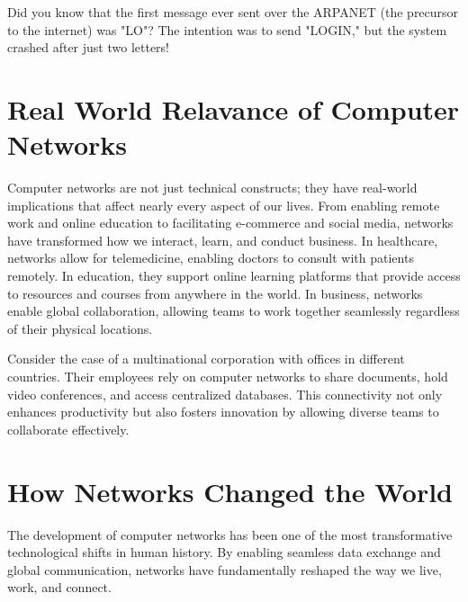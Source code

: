 \begin{didyouknowbox}
    Did you know that the first message ever sent over the ARPANET (the precursor to the internet) was "LO"? The intention was to send "LOGIN," but the system crashed after just two letters!
\end{didyouknowbox}


\section{Real World Relavance of Computer Networks}
Computer networks are not just technical constructs; they have real-world implications that affect nearly every aspect of our lives. From enabling remote work and online education to facilitating e-commerce and social media, networks have transformed how we interact, learn, and conduct business.
In healthcare, networks allow for telemedicine, enabling doctors to consult with patients remotely. In education, they support online learning platforms that provide access to resources and courses from anywhere in the world. In business, networks enable global collaboration, allowing teams to work together seamlessly regardless of their physical locations.
\begin{casestudybox}
    Consider the case of a multinational corporation with offices in different countries. Their employees rely on computer networks to share documents, hold video conferences, and access centralized databases. This connectivity not only enhances productivity but also fosters innovation by allowing diverse teams to collaborate effectively.
\end{casestudybox}

\section{How Networks Changed the World}
The development of computer networks has been one of the most transformative technological shifts in human history. By enabling seamless data exchange and global communication, networks have fundamentally reshaped the way we live, work, and connect.

